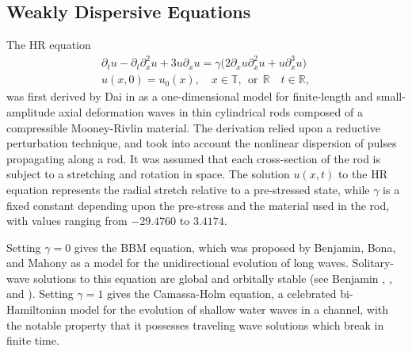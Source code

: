 \documentclass[12pt,reqno]{amsart}
\newcommand{\rr}{\mathbb{R}}
\newcommand{\ci}{\mathbb{T}}
\newcommand{\p}{\partial}
\begin{document}
\subsection{Weakly Dispersive Equations} 
\label{ssec:weak-disp}
The HR equation
\begin{gather}
\label{hr}
\p_t u
-
\p_t \p_x^2 u
+
3u\p_x u
=
\gamma \big (
2\p_x u \p_x^2 u
+
u \p_x^3 u
\big )
\\
\label{hr-data} u(x, 0) = u_0 (x),
\quad x  \in \ci, \ \ \text{or} \ \ \rr \quad t \in \rr,
\end{gather}
was first
derived by Dai in \cite{Dai_1998_Model-equations} as a one-dimensional 
model for finite-length and
small-amplitude axial deformation waves in thin cylindrical
rods composed of a compressible Mooney-Rivlin
material. The derivation relied upon a reductive perturbation technique, 
and took into account the nonlinear dispersion of pulses propagating 
along a rod. It was assumed that each cross-section of the rod is 
subject to a stretching and rotation in space. The solution $u(x,t)$ to the 
HR equation represents the radial stretch relative
to a pre-stressed state, while $\gamma$ is a fixed constant depending upon 
the pre-stress and the material used in
the rod, with values ranging from $- 29.4760$ to $3.4174$.

Setting $\gamma = 0$ gives the 
BBM equation, which was proposed by 
Benjamin, Bona, and Mahony 
\cite{Benjamin_1972_Model-equations} as a model for 
the unidirectional evolution of long waves.
Solitary-wave solutions to this 
equation are global and orbitally stable (see Benjamin 
\cite{Benjamin_1972_The-stability-o}, 
\cite{Benjamin_1972_Model-equations}, and 
\cite{Constantin_2000_Stability-of-a-}).
Setting $\gamma =1$ gives the Camassa-Holm equation, a celebrated bi-Hamiltonian
model for the evolution of shallow water waves in a channel, with the notable
property that it possesses traveling wave solutions which break in
finite time.
\end{document}
